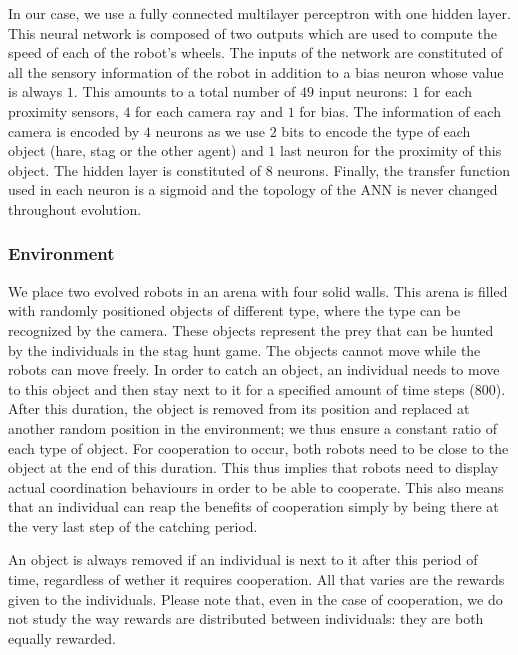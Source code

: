     In our case, we use a fully connected multilayer perceptron with one hidden layer. This neural network is composed of two outputs which are used to compute the speed of each of the robot's wheels. The inputs of the network are constituted of all the sensory information of the robot in addition to a bias neuron whose value is always $1$. This amounts to a total number of $49$ input neurons: $1$ for each proximity sensors, $4$ for each camera ray and $1$ for bias. The information of each camera is encoded by $4$ neurons as we use $2$ bits to encode the type of each object (hare, stag or the other agent) and $1$ last neuron for the proximity of this object. The hidden layer is constituted of $8$ neurons. Finally, the transfer function used in each neuron is a sigmoid and the topology of the ANN is never changed throughout evolution.

    \subsubsection{Environment} We place two evolved robots in an arena with four solid walls. This arena is filled with randomly positioned objects of different type, where the type can be recognized by the camera. These objects represent the prey that can be hunted by the individuals in the stag hunt game. The objects cannot move while the robots can move freely. In order to catch an object, an individual needs to move to this object and then stay next to it for a specified amount of time steps ($800$). After this duration, the object is removed from its position and replaced at another random position in the environment; we thus ensure a constant ratio of each type of object. For cooperation to occur, both robots need to be close to the object at the end of this duration. This thus implies that robots need to display actual coordination behaviours in order to be able to cooperate. This also means that an individual can reap the benefits of cooperation simply by being there at the very last step of the catching period.

    An object is always removed if an individual is next to it after this period of time, regardless of wether it requires cooperation. All that varies are the rewards given to the individuals. Please note that, even in the case of cooperation, we do not study the way rewards are distributed between individuals: they are both equally rewarded.


